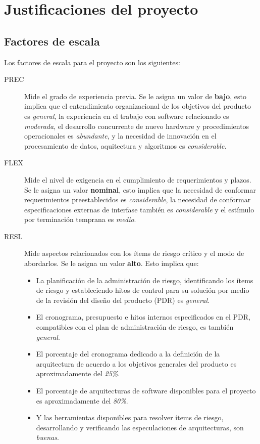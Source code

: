\documentclass[11pt,a4paper,spanish,twoside]{book}
\begin{document}
\chapter{Justificaciones del proyecto}
\section{Factores de escala}
Los factores de escala para el proyecto son los siguientes:
\begin{description}
\item[PREC] Mide el grado de experiencia previa. Se le asigna un valor de
\textbf{bajo}, esto implica que el entendimiento organizacional de los
objetivos del producto es \emph{general}, la experiencia en el trabajo con 
software relacionado es \emph{moderada}, el desarrollo concurrente de nuevo
hardware y procedimientos operacionales es \emph{abundante}, y la necesidad
de innovación en el procesamiento de datos, aquitectura y algoritmos es
\emph{considerable}.

\item[FLEX] Mide el nivel de exigencia en el cumplimiento de requerimientos
y plazos. Se le asigna un valor \textbf{nominal}, esto implica que la
necesidad de conformar requerimientos preestablecidos es \emph{considerable},
la necesidad de conformar especificaciones externas de interfase también es
\emph{considerable} y el estímulo por terminación temprana es \emph{medio}.

\item[RESL] Mide aspectos relacionados con los ítems de riesgo crítico y el
modo de abordarlos. Se le asigna un valor \textbf{alto}. Esto implica que:
\begin{itemize}
\item La planificación de la administración de riesgo, identificando los
ítems de riesgo y estableciendo hitos de control para su solución por medio
de la revisión del diseño del producto (PDR) es \emph{general}.
\item El cronograma, presupuesto e hitos internos especificados en el PDR,
compatibles con el plan de administración de riesgo, es también \emph{general}.
\item El porcentaje del cronograma dedicado a la definición de la arquitectura
de acuerdo a los objetivos generales del producto es aproximadamente del
\emph{25\%}.
\item El porcentaje de arquitecturas de software disponibles para el proyecto
es aproximadamente del \emph{80\%}.
\item Y las herramientas disponibles para resolver ítems de riesgo,
desarrollando y verificando las especulaciones de arquitecturas, son
\emph{buenas}.
\end{itemize}


\end{description}
\end{document}
